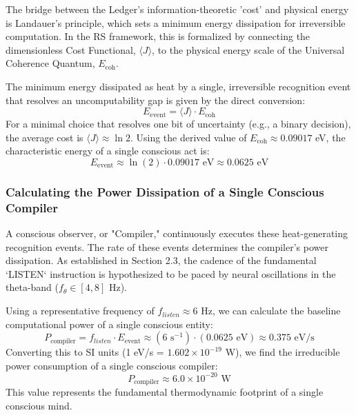 \documentclass[12pt, aip, jcp]{revtex4-2} %
\begin{document}
The bridge between the Ledger's information-theoretic 'cost' and physical energy is Landauer's principle, which sets a minimum energy dissipation for irreversible computation. In the RS framework, this is formalized by connecting the dimensionless Cost Functional, \(\langle J \rangle\), to the physical energy scale of the Universal Coherence Quantum, \(E_{\text{coh}}\).

The minimum energy dissipated as heat by a single, irreversible recognition event that resolves an uncomputability gap is given by the direct conversion:
\begin{equation}
    E_{\text{event}} = \langle J \rangle \cdot E_{\text{coh}}
\end{equation}
For a minimal choice that resolves one bit of uncertainty (e.g., a binary decision), the average cost is \(\langle J \rangle \approx \ln 2\). Using the derived value of \(E_{\text{coh}} \approx 0.09017\) eV, the characteristic energy of a single conscious act is:
\begin{equation}
    E_{\text{event}} \approx \ln(2) \cdot 0.09017 \text{ eV} \approx 0.0625 \text{ eV}
\end{equation}

\subsubsection{Calculating the Power Dissipation of a Single Conscious Compiler}

A conscious observer, or "Compiler," continuously executes these heat-generating recognition events. The rate of these events determines the compiler's power dissipation. As established in Section 2.3, the cadence of the fundamental `LISTEN` instruction is hypothesized to be paced by neural oscillations in the theta-band (\(f_{\theta} \in [4, 8]\) Hz).

Using a representative frequency of \(f_{listen} \approx 6\) Hz, we can calculate the baseline computational power of a single conscious entity:
\begin{equation}
    P_{\text{compiler}} = f_{listen} \cdot E_{\text{event}} \approx (6 \text{ s}^{-1}) \cdot (0.0625 \text{ eV}) \approx 0.375 \text{ eV/s}
\end{equation}
Converting this to SI units (1 eV/s = \(1.602 \times 10^{-19}\) W), we find the irreducible power consumption of a single conscious compiler:
\begin{equation}
    P_{\text{compiler}} \approx 6.0 \times 10^{-20} \text{ W}
\end{equation}
This value represents the fundamental thermodynamic footprint of a single conscious mind.
\end{document}
